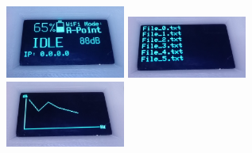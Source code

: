 \documentclass[a4paper,12pt,oneside,pdflatex,italian,final,twocolumn]{article}
\begin{document}
\begin{figure} [h]
    \centering
    \includegraphics[width=0.35\textwidth,]{images/display-home.jpg}
    \includegraphics[width=0.35\textwidth,]{images/display-file.jpg}
    \includegraphics[width=0.35\textwidth,]{images/display-plot.jpg}
\end{figure}


\end{document}
